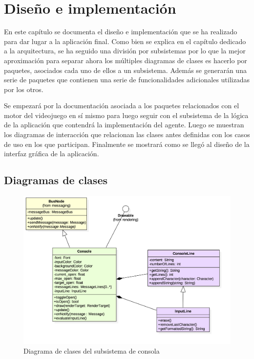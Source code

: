 \chapter{Diseño e implementación}

En este capítulo se documenta el diseño e implementación que se ha realizado para dar lugar a la aplicación final. Como bien se explica en el capítulo dedicado a la arquitectura, se ha seguido una división por subsistemas por lo que la mejor aproximación para separar ahora los múltiples diagramas de clases es hacerlo por paquetes, asociados cada uno de ellos a un subsistema. Además se generarán una serie de paquetes que contienen una serie de funcionalidades adicionales utilizadas por los otros.

\bigskip

Se empezará por la documentación asociada a los paquetes relacionados con el motor del videojuego en sí mismo para luego seguir con el subsistema de la lógica de la aplicación que contendrá la implementación del agente. Luego se muestran los diagramas de interacción que relacionan las clases antes definidas con los casos de uso en los que participan. Finalmente se mostrará como se llegó al diseño de la interfaz gráfica de la aplicación.

\section{Diagramas de clases}


\begin{figure}
	\centerline{\includegraphics[width=15cm]{otros/UML/png/alld/png/console__diagramaDeClases_console_3.png}}
	\caption{Diagrama de clases del subsistema de consola}
	\label{class:console}
\end{figure}

